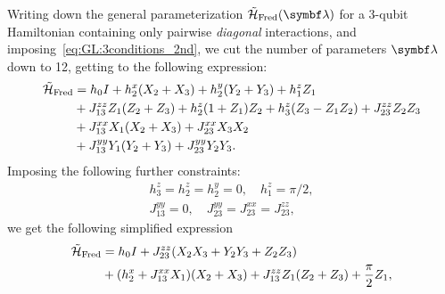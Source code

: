 Writing down the general parameterization $\HTildeFred(\bs\lambda)$ for a 3-qubit Hamiltonian containing only pairwise \emph{diagonal} interactions,
and imposing~\cref{eq:GL:3conditions_2nd}, we cut the number of parameters $\bs\lambda$ down to 12, getting to the following expression:
\begin{equation}
\begin{aligned}
    \tilde{{\mathcal{H}}}_{\operatorname{Fred}} &=
    h_0 I
    + h_2^x (X_2 + X_3)
    + h_2^y (Y_2 + Y_3)
    + h_1^z Z_1 \\
    &+ J_{13}^{zz} Z_1(Z_2 + Z_3)
    + h_2^z (1 + Z_1) Z_2
    + h_3^z (Z_3 - Z_1 Z_2)
    + J_{23}^{zz} Z_2 Z_3 \\
    &+ J_{13}^{xx} X_1(X_2 + X_3)
    + J_{23}^{xx} X_3 X_2 \\
    &+ J_{13}^{yy} Y_1 (Y_2 + Y_3)
    + J_{23}^{yy} Y_2 Y_3.
\end{aligned}
\end{equation}
Imposing the following further constraints:
\begin{equation}
\begin{gathered}
    h_3^z = h_2^z = h_2^y = 0, \quad
    h_1^z = \pi/2, \\
    J_{13}^{yy} = 0,\quad
    J_{23}^{yy} = J_{23}^{xx} = J_{23}^{zz},
\end{gathered}
\end{equation}
we get the following simplified expression
\begin{equation}
\begin{aligned}
    \tilde{{\mathcal{H}}}_{\operatorname{Fred}} &=
    h_0 I
    + J_{23}^{zz} (X_2 X_3 + Y_2 Y_3 + Z_2 Z_3) \\
    &+ (h_2^x + J_{13}^{xx} X_1)(X_2 + X_3)
    + J_{13}^{zz} Z_1 (Z_2 + Z_3)
    + \frac{\pi}{2}  Z_1,
\end{aligned}
\end{equation}
